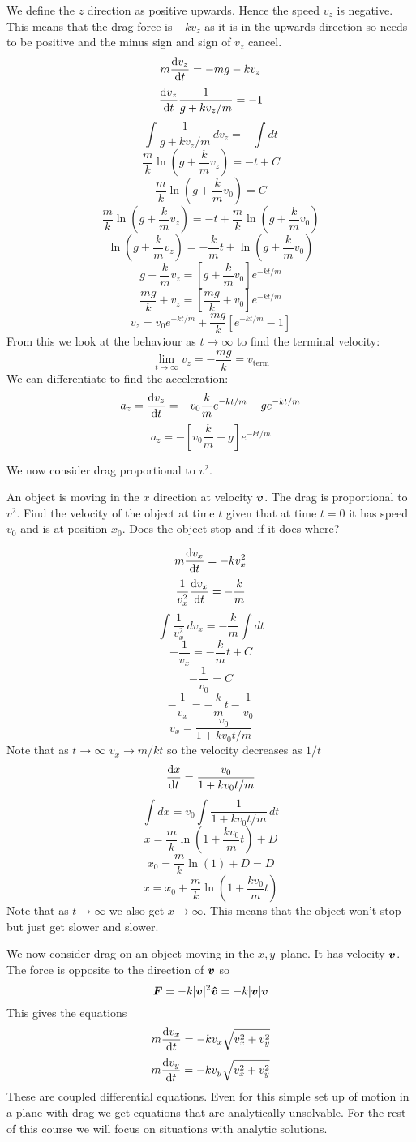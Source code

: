 \documentclass{article}
\begin{document}
    We define the \(z\) direction as positive upwards.
    Hence the speed \(v_z\) is negative.
    This means that the drag force is \(-kv_z\) as it is in the upwards direction so needs to be positive and the minus sign and sign of \(v_z\) cancel.
    \[m\dv{v_z}{t} = -mg - kv_z\]
    \[\dv{v_z}{t}\frac{1}{g + kv_z/m} = -1\]
    \[\int\frac{1}{g + kv_z/m}\,dv_z= -\int dt\]
    \[\frac{m}{k}\ln\left(g + \frac{k}{m}v_z\right) = -t + C\]
    \[\frac{m}{k}\ln\left(g + \frac{k}{m}v_0\right) = C\]
    \[\frac{m}{k}\ln\left(g + \frac{k}{m}v_z\right) = -t + \frac{m}{k}\ln\left(g + \frac{k}{m}v_0\right)\]
    \[\ln\left(g + \frac{k}{m}v_z\right) = -\frac{k}{m}t + \ln\left(g + \frac{k}{m}v_0\right)\]
    \[g + \frac{k}{m}v_z = \left[g + \frac{k}{m}v_0\right]e^{-kt/m}\]
    \[\frac{mg}{k} + v_z = \left[\frac{mg}{k} + v_0\right]e^{-kt/m}\]
    \[v_z = v_0e^{-kt/m} + \frac{mg}{k}\left[e^{-kt/m} - 1\right]\]
    From this we look at the behaviour as \(t\to \infty\) to find the terminal velocity:
    \[\lim_{t\to\infty} v_z = -\frac{mg}{k} = v_\text{term}\]
    We can differentiate to find the acceleration:
    \[a_z = \dv{v_z}{t} = -v_0\frac{k}{m}e^{-kt/m} - ge^{-kt/m}\]
    \[a_z = -\left[v_0\frac{k}{m} + g\right]e^{-kt/m}\]
    
    We now consider drag proportional to \(v^2\).
    
    \example
    An object is moving in the \(x\) direction at velocity \(\bm{v}\).
    The drag is proportional to \(v^2\).
    Find the velocity of the object at time \(t\) given that at time \(t = 0\) it has speed \(v_0\) and is at position \(x_0\).
    Does the object stop and if it does where?
    
    \[m\dv{v_x}{t} = -k v_x^2\]
    \[\frac{1}{v_x^2}\dv{v_x}{t} = -\frac{k}{m}\]
    \[\int \frac{1}{v_x^2}\,dv_x = -\frac{k}{m}\int dt\]
    \[-\frac{1}{v_x} = -\frac{k}{m}t + C\]
    \[-\frac{1}{v_0} = C\]
    \[-\frac{1}{v_x} = -\frac{k}{m}t - \frac{1}{v_0}\]
    \[v_x = \frac{v_0}{1 + kv_0t/m}\]
    Note that as \(t\to \infty\) \(v_x\to m/kt\) so the velocity decreases as \(1/t\)
    \[\dv{x}{t} = \frac{v_0}{1 + kv_0t/m}\]
    \[\int dx = v_0\int\frac{1}{1 + kv_0t/m}\,dt\]
    \[x = \frac{m}{k}\ln\left(1 + \frac{kv_0}{m}t\right) + D\]
    \[x_0 = \frac{m}{k}\ln\left(1\right) + D = D\]
    \[x = x_0 + \frac{m}{k}\ln\left(1 + \frac{kv_0}{m}t\right)\]
    Note that as \(t\to \infty\) we also get \(x\to \infty\).
    This means that the object won't stop but just get slower and slower.
    
    \example
    We now consider drag on an object moving in the \(x,y\)--plane.
    It has velocity \(\bm{v}\). The force is opposite to the direction of \(\bm{v}\) so
    \[\bm{F} = -k|\bm{v}|^2\bm{\hat{v}} = -k|\bm{v}|\bm{v}\]
    This gives the equations
    \[m\dv{v_x}{t} = -kv_x\sqrt{v_x^2 + v_y^2}\]
    \[m\dv{v_y}{t} = -kv_y\sqrt{v_x^2 + v_y^2}\]
    These are coupled differential equations.
    Even for this simple set up of motion in a plane with drag we get equations that are analytically unsolvable.
    For the rest of this course we will focus on situations with analytic solutions.
    
\end{document}
